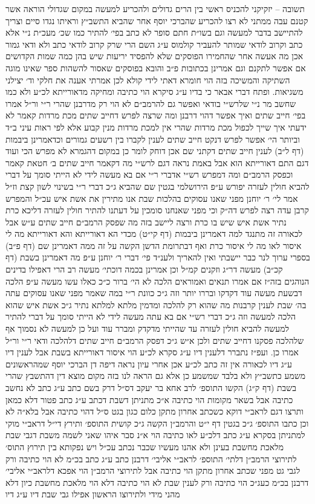 \documentclass[12pt, openany]{book}
\begin{document}
\begin{multicols}{2}
תשובה – יזקיקני להכניס ראשי בין הרים גדולים ולהכריע למעשה במקום שגדולי הוראה אשר קטנם עבה ממתני לא רצו להכריע שהברכי יוסף אחר שהביא התשב״ץ וראיתו נגדו סיים וצריך להתיישב בדבר למעשה וגם בשו״ת חתם סופר לא כתב בפי׳ להתיר כמו שכ׳ מעכ״ת נ״י אלא כתב וקרוב לודאי שמותר להעביר קולמוס ע״ג השם הרי שרק קרוב לודאי כתב ולא ודאי גמור אכן מה אעשה אחר שהחמירו הפוסקים שלא להפסיד יריעות שיש בהן כמה שמות הקדושים אם אפשר לתקנם וגם אמרינן בכתובות פ״ב והובא בפוסקים שאסור להשהות ספר שאינו מוגה השתיקה והמשיכה בזה הוי חומרא דאתי לידי קולא לכן אמרתי אענה את חלקי וד׳ יצילני משגיאות. ופתח דברי אבאר כי בדיו ע״ג סיקרא הוי כתיבה ומחיקה מדאורייתא לכ״ע ולא כמו שחשב מר נ״י שלרש״י בודאי ואפשר גם להרמב״ם לא הוי רק מדרבנן שהרי ר״י ור״ל אמרו בפי׳ חייב שתים ואיך אפשר דהוי דרבנן ומה שרצה לפרש דחייב שתים מכת מרדות קאמר לא ידעתי איך שייך לכפול מכת מרדות שהרי אין למכת מרדות מנין קבוע אלא לפי ראות עיני ב״ד וביותר הי׳ אפשר לפרש דנקט חייב שתים לענין לקברו בין רשעים גמורים וכדאמרינן ביבמות (דף ל״ב) לענין חייב שתים דקתני שם אכן דוחק לומר כן במקום דהגמרא לא מפרש הכי ועוד דגם התם דאורייתא הוא אבל באמת נראה דגם לרש״י מה דקאמר חייב שתים ב׳ חטאת קאמר וכפסק הרמב״ם ומה דמפרש רש״י אדברי ר״י אם בא מעשה לידי לא הייתי סומך על דברי להביא חולין לעזרה יפורש ע״פ הירושלמי בגטין שם שהביא ג״כ דברי ר״י בשינוי לשון קצת וז״ל אמר לי׳ ר׳ יוחנן מפני שאנו עסוקים בהלכות שבת אנו מתירין את אשת איש עכ״ל והמפרש קרבן עדה רצה לפרש דה״ק וכי מפני שאנחנו סומכין על דעתנו להתיר חולין לעזרה דליכא כרת נתיר אשת איש שיש בו כרת ורצה ליישב בזה מה שפסק הרמב״ם חייב שתים ע״ש אבל לכאורה זה מתנגד למה דאמרינן ביבמות (דף קי״ט) מכדי הא דאורייתא והא דאורייתא מה לי איסור לאו מה לי איסור כרת ואף דבתרומת הדשן הקשה על זה ממה דאמרינן שם (דף פ״ב) בספרי ערוך לנר כבר יישבתי ואין להאריך ולענ״ד פי׳ דברי ר׳ יוחנן ע״פ מה דאמרינן בשבת (דף קכ״ב) מעשה דר״ג וזקנים קמ״ל וכן אמרינן בכמה דוכתי׳ מעשה רב הרי דאפילו בדינים הנוהגים בזה״ז אם אמרו תנאים ואמוראים הלכה לא הי׳ ברור כ״כ כאלו עשו מעשה ע״פ הלכה דבשעת מעשה עוד דקדקו ובררו יותר וזה ג״כ כוונת ר״י במה שאמר מפני שאנו עסוקים עתה בה׳ שבת לענין קרבנות מה שהוא רק להלכה ומדמין מלתא למלתא נתיר ג״כ אשת איש שהוא הלכה למעשה וזה ג״כ דברי רש״י אם בא עתה מעשה לידי לא הייתי סומך על דברי להתיר למעשה להביא חולין לעזרה עד שהייתי מדקדק ומברר עוד ועל כן למעשה לא נסמוך אף שלהלכה פסקנו דחייב שתים ולכן א״ש ג״כ דפסק הרמב״ם חייב שתים דלהלכה ודאי ר״י ור״ל אמרו כן. ועפ״ז נתברר דלענין דיו ע״ג סקרא לכ״ע הוי איסור דאורייתא בשבת אבל לענין דיו ע״ג דיו לכאורה אין זה כתב לכ״ע אכן אחרי עיון נראה דיפה דן הברכי יוסף שמהראשונים משמע כתשב״ץ ולא בלבד שמשמע כן אלא גם הראה לנו בזה מקום מוצא דין דהתשבץ שהרי בשבת (דף ק״ג) הקשו התוספ׳ לרב אחא בר יעקב דס״ל דרק בשם כתב ע״ג כתב לא נחשב כתיבה אבל בשאר מקומות הוי כתיבה א״כ מתניתן דשבת דכתב ע״ג כתב פטור דלא כמאן ותרצו דגם לראב״י דוקא כשכתב אחרון מתקן כלום כגון בגט ס״ל דהוי כתיבה אבל בלא״ה לא וכן כתבו התוספ׳ ג״כ בגטין דף י״ט והרמב״ן הקשה ג״כ קושית התוספ׳ ותירץ די״ל דראב״י מוקי למתניתן בסקרא ע״ג כתב דלכ״ע לאו כתיבה הוי א״נ סבר איהו שאני לשמה משבת דגבי שבת מלאכת מחשבת בעינן ולא אהנו מעשיו שכבר נכתב עכ״ל ויש נפקותא בין תירוץ התוס׳ לתירוצי הרמב״ן דלתי׳ התוספ׳ לראב״י אליבי׳ דרבנן כתב ע״ג כתב בכ״מ לא הוי כתיבה ורק לגבי גט מפני שכתב אחרון מתקן הוי כתיבה אבל לתירוצי הרמב״ן הוי אפכא דלראב״י אליבי׳ דרבנן בכ״מ כעג״כ הוי כתיבה ורק לענין שבת לא הוי כתיבה דלא הוי מלאכת מחשבת כיון דלא מהני מידי ולתירוצו הראשון אפילו גבי שבת דיו ע״ג דיו 
\end{multicols}
\end{document}
